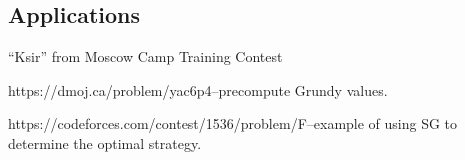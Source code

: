 \documentclass[11pt]{scrartcl}
\begin{document}
\begin{definition}
  \section{Applications}

  ``Ksir'' from Moscow Camp Training Contest

  https://dmoj.ca/problem/yac6p4--precompute Grundy values.

  https://codeforces.com/contest/1536/problem/F--example of using SG to determine the optimal strategy.

\end{definition}
\end{document}

